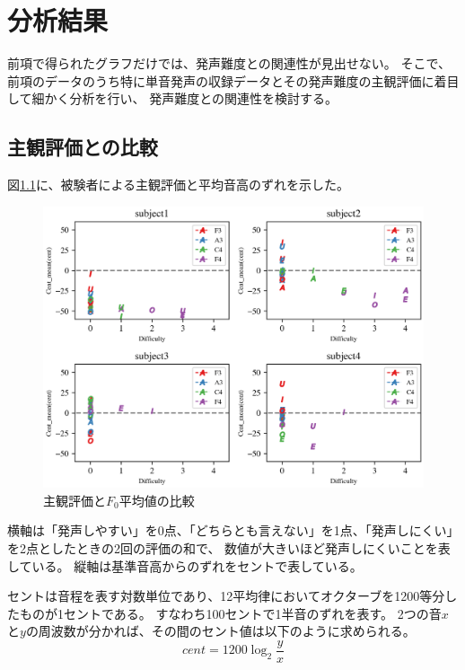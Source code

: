 \documentclass[10.5ptj,a4j,dvipdfmx,uplatex, oneside, openany, report]{jsbook}%
\begin{document}

\chapter{分析結果}
前項で得られたグラフだけでは、発声難度との関連性が見出せない。
そこで、前項のデータのうち特に単音発声の収録データとその発声難度の主観評価に着目して細かく分析を行い、
発声難度との関連性を検討する。

\section{主観評価との比較}
図\ref{fig:difficulty}に、被験者による主観評価と平均音高のずれを示した。

\begin{figure}[thbp]
    \begin{center}
      \includegraphics[clip,width=12.0cm]{ease.png}
      \caption{主観評価と$F_0$平均値の比較}
      \label{fig:difficulty}
    \end{center}
\end{figure}

横軸は「発声しやすい」を0点、「どちらとも言えない」を1点、「発声しにくい」を2点としたときの2回の評価の和で、
数値が大きいほど発声しにくいことを表している。
縦軸は基準音高からのずれをセントで表している。

セントは音程を表す対数単位であり、12平均律においてオクターブを1200等分したものが1セントである。
すなわち100セントで1半音のずれを表す。
2つの音$x$と$y$の周波数が分かれば、その間のセント値は以下のように求められる。
\begin{equation}
    cent = 1200 \log_2 \frac{y}{x} 
\end{equation}
\end{document}
